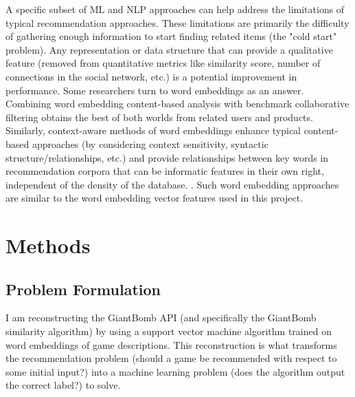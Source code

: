 \documentclass[10pt,twocolumn]{article}
\begin{document}
A specific subset of ML and NLP approaches can help address the limitations of typical recommendation approaches. These limitations are primarily the difficulty of gathering enough information to start finding related items (the "cold start" problem). Any representation or data structure that can provide a qualitative feature (removed from quantitative metrics like similarity score, number of connections in the social network, etc.) is a potential improvement in performance. Some researchers turn to word embeddings as an answer. Combining word embedding content-based analysis with benchmark collaborative filtering obtains the best of both worlds from related users and products. \cite{LNguyen} Similarly, context-aware methods of word embeddings enhance typical content-based approaches (by considering context sensitivity, syntactic structure/relationships, etc.) and provide relationships between key words in recommendation corpora that can be informatic features in their own right, independent of the density of the database. \cite{CSundermann, Ramzan}. Such word embedding approaches are similar to the word embedding vector features used in this project. 

\section{Methods}



\subsection{Problem Formulation}

I am reconstructing the GiantBomb API \cite{GiantBomb} (and specifically the GiantBomb similarity algorithm) by using a support vector machine algorithm trained on word embeddings of game descriptions. This reconstruction is what transforms the recommendation problem (should a game be recommended with respect to some initial input?) into a machine learning problem (does the algorithm output the correct label?) to solve.
\end{document}
